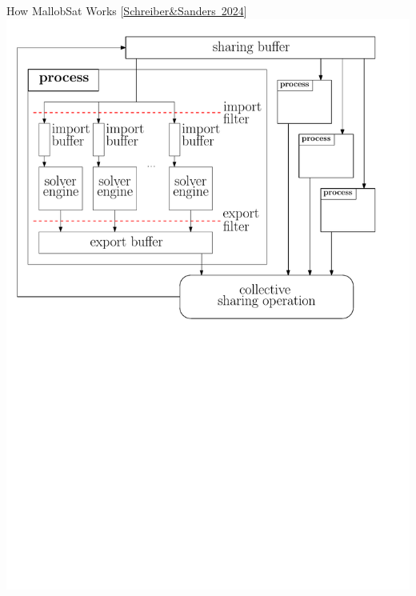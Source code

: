 \documentclass[]{sdqbeamer}
\begin{document}
\begin{frame}{How MallobSat Works [\href{https://www.jair.org/index.php/jair/article/download/15827/27072}{Schreiber\&Sanders~2024}]}
    \center
    \includegraphics[scale=.8]{figures/mallob_architecture.pdf}
\end{frame}
\end{document}
